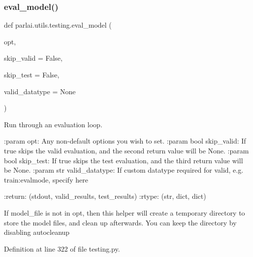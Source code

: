 \subsubsection{\texorpdfstring{eval\+\_\+model()}{eval\_model()}}
{\footnotesize\ttfamily def parlai.\+utils.\+testing.\+eval\+\_\+model (\begin{DoxyParamCaption}\item[{}]{opt,  }\item[{}]{skip\+\_\+valid = {\ttfamily False},  }\item[{}]{skip\+\_\+test = {\ttfamily False},  }\item[{}]{valid\+\_\+datatype = {\ttfamily None} }\end{DoxyParamCaption})}

\begin{DoxyVerb}Run through an evaluation loop.

:param opt:
    Any non-default options you wish to set.
:param bool skip_valid:
    If true skips the valid evaluation, and the second return value will be None.
:param bool skip_test:
    If true skips the test evaluation, and the third return value will be None.
:param str valid_datatype:
    If custom datatype required for valid, e.g. train:evalmode, specify here

:return: (stdout, valid_results, test_results)
:rtype: (str, dict, dict)

If model_file is not in opt, then this helper will create a temporary directory
to store the model files, and clean up afterwards. You can keep the directory
by disabling autocleanup
\end{DoxyVerb}
 

Definition at line 322 of file testing.\+py.


